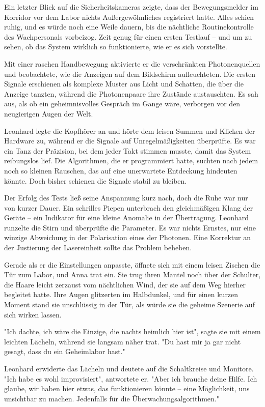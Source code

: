 \documentclass[
]{article}
\begin{document}
Ein letzter Blick auf die Sicherheitskameras zeigte, dass der
Bewegungsmelder im Korridor vor dem Labor nichts Außergewöhnliches
registriert hatte. Alles schien ruhig, und es würde noch eine Weile
dauern, bis die nächtliche Routinekontrolle des Wachpersonals vorbeizog.
Zeit genug für einen ersten Testlauf -- und um zu sehen, ob das System
wirklich so funktionierte, wie er es sich vorstellte.

Mit einer raschen Handbewegung aktivierte er die verschränkten
Photonenquellen und beobachtete, wie die Anzeigen auf dem Bildschirm
aufleuchteten. Die ersten Signale erschienen als komplexe Muster aus
Licht und Schatten, die über die Anzeige tanzten, während die
Photonenpaare ihre Zustände austauschten. Es sah aus, als ob ein
geheimnisvolles Gespräch im Gange wäre, verborgen vor den neugierigen
Augen der Welt.

Leonhard legte die Kopfhörer an und hörte dem leisen Summen und Klicken
der Hardware zu, während er die Signale auf Unregelmäßigkeiten
überprüfte. Es war ein Tanz der Präzision, bei dem jeder Takt stimmen
musste, damit das System reibungslos lief. Die Algorithmen, die er
programmiert hatte, suchten nach jedem noch so kleinen Rauschen, das auf
eine unerwartete Entdeckung hindeuten könnte. Doch bisher schienen die
Signale stabil zu bleiben.

Der Erfolg des Tests ließ seine Anspannung kurz nach, doch die Ruhe war
nur von kurzer Dauer. Ein schrilles Piepen unterbrach den gleichmäßigen
Klang der Geräte -- ein Indikator für eine kleine Anomalie in der
Übertragung. Leonhard runzelte die Stirn und überprüfte die Parameter.
Es war nichts Ernstes, nur eine winzige Abweichung in der Polarisation
eines der Photonen. Eine Korrektur an der Justierung der Lasereinheit
sollte das Problem beheben.

Gerade als er die Einstellungen anpasste, öffnete sich mit einem leisen
Zischen die Tür zum Labor, und Anna trat ein. Sie trug ihren Mantel noch
über der Schulter, die Haare leicht zerzaust vom nächtlichen Wind, der
sie auf dem Weg hierher begleitet hatte. Ihre Augen glitzerten im
Halbdunkel, und für einen kurzen Moment stand sie unschlüssig in der
Tür, als würde sie die geheime Szenerie auf sich wirken lassen.

"Ich dachte, ich wäre die Einzige, die nachts heimlich hier ist", sagte
sie mit einem leichten Lächeln, während sie langsam näher trat. "Du hast
mir ja gar nicht gesagt, dass du ein Geheimlabor hast."

Leonhard erwiderte das Lächeln und deutete auf die Schaltkreise und
Monitore. "Ich habe es wohl improvisiert", antwortete er. "Aber ich
brauche deine Hilfe. Ich glaube, wir haben hier etwas, das funktionieren
könnte -- eine Möglichkeit, uns unsichtbar zu machen. Jedenfalls für die
Überwachungsalgorithmen."
\end{document}
